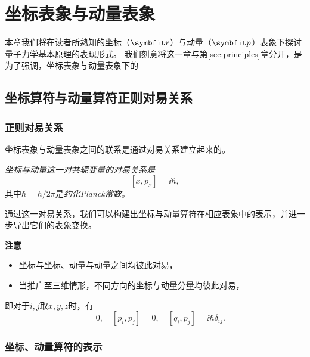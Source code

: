 
\section{坐标表象与动量表象}
\label{sec:coord_moment_rep}

本章我们将在读者所熟知的坐标（$\rr$）与动量（$\pp$）表象下探讨量子力学基本原理的表现形式。
我们刻意将这一章与第\ref{sec:principles}章分开，是为了强调，坐标表象与动量表象下的

\subsection{\texorpdfstring{坐标算符与动量算符\quad 正则对易关系}{坐标算符与动量算符  正则对易关系}}
\label{subsec:cmr_operators}

\subsubsection{正则对易关系}

坐标表象与动量表象之间的联系是通过对易关系建立起来的。
\begin{tcolorbox}
\emph{坐标与动量这一对共轭变量的对易关系是}
\begin{equation}
    \label{eq:cmr_commutator}
    [x, p_x] = \ii\hbar,
\end{equation}
其中$\hbar=h/2\pi$是\emph{约化Planck常数}。
\end{tcolorbox}
通过这一对易关系，我们可以构建出坐标与动量算符在相应表象中的表示，并进一步导出它们的表象变换。

\begin{tcolorbox}
\textbf{注意}
\begin{itemize}
    \item{坐标与坐标、动量与动量之间均彼此对易，}
    \item{当推广至三维情形，不同方向的坐标与动量分量均彼此对易，}
\end{itemize}
即对于$i,j$取$x,y,z$时，有
\begin{equation}
    [q_i, q_j]=0,\quad [p_i, p_j]=0,\quad [q_i,p_j]=\ii\hbar\delta_{ij}.
\end{equation}
\end{tcolorbox}


\subsubsection{坐标、动量算符的表示}

